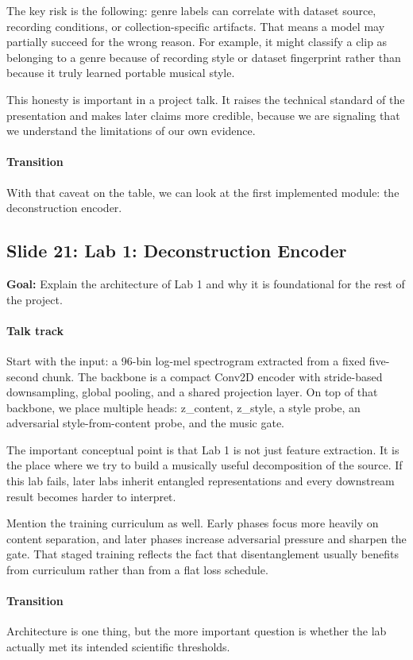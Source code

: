\documentclass[11pt]{article}
\begin{document}
The key risk is the following: genre labels can correlate with dataset source, recording conditions, or collection-specific artifacts. That means a model may partially succeed for the wrong reason. For example, it might classify a clip as belonging to a genre because of recording style or dataset fingerprint rather than because it truly learned portable musical style.

This honesty is important in a project talk. It raises the technical standard of the presentation and makes later claims more credible, because we are signaling that we understand the limitations of our own evidence.

\paragraph{Transition}
With that caveat on the table, we can look at the first implemented module: the deconstruction encoder.

\subsection*{Slide 21: Lab 1: Deconstruction Encoder}
\textbf{Goal:} Explain the architecture of Lab 1 and why it is foundational for the rest of the project.
\paragraph{Talk track}
Start with the input: a 96-bin log-mel spectrogram extracted from a fixed five-second chunk. The backbone is a compact Conv2D encoder with stride-based downsampling, global pooling, and a shared projection layer. On top of that backbone, we place multiple heads: z\_content, z\_style, a style probe, an adversarial style-from-content probe, and the music gate.

The important conceptual point is that Lab 1 is not just feature extraction. It is the place where we try to build a musically useful decomposition of the source. If this lab fails, later labs inherit entangled representations and every downstream result becomes harder to interpret.

Mention the training curriculum as well. Early phases focus more heavily on content separation, and later phases increase adversarial pressure and sharpen the gate. That staged training reflects the fact that disentanglement usually benefits from curriculum rather than from a flat loss schedule.

\paragraph{Transition}
Architecture is one thing, but the more important question is whether the lab actually met its intended scientific thresholds.
\end{document}
